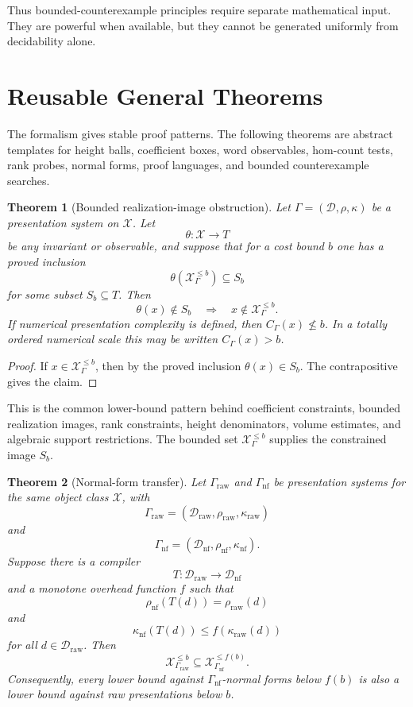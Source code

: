 \documentclass[11pt]{article}
\newtheorem{theorem}{Theorem}[section]
\begin{document}
Thus bounded-counterexample principles require separate mathematical input. They are powerful when available, but they cannot be generated uniformly from decidability alone.


\section{Reusable General Theorems}

The formalism gives stable proof patterns. The following theorems are abstract templates for height balls, coefficient boxes, word observables, hom-count tests, rank probes, normal forms, proof languages, and bounded counterexample searches.

\begin{theorem}[Bounded realization-image obstruction]
Let \(\Gamma=(\mathcal D,\rho,\kappa)\) be a presentation system on \(\mathcal X\). Let
\[
\theta:\mathcal X\to T
\]
be any invariant or observable, and suppose that for a cost bound \(b\) one has a proved inclusion
\[
\theta(\mathcal X_\Gamma^{\leq b})\subseteq S_b
\]
for some subset \(S_b\subseteq T\). Then
\[
\theta(x)\notin S_b
\quad\Longrightarrow\quad
x\notin\mathcal X_\Gamma^{\leq b}.
\]
If numerical presentation complexity is defined, then \(C_\Gamma(x)\nleq b\). In a totally ordered numerical scale this may be written \(C_\Gamma(x)>b\).
\end{theorem}

\begin{proof}
If \(x\in\mathcal X_\Gamma^{\leq b}\), then by the proved inclusion \(\theta(x)\in S_b\). The contrapositive gives the claim.
\end{proof}

This is the common lower-bound pattern behind coefficient constraints, bounded realization images, rank constraints, height denominators, volume estimates, and algebraic support restrictions. The bounded set \(\mathcal X_\Gamma^{\leq b}\) supplies the constrained image \(S_b\).

\begin{theorem}[Normal-form transfer]
Let \(\Gamma_{\mathrm{raw}}\) and \(\Gamma_{\mathrm{nf}}\) be presentation systems for the same object class \(\mathcal X\), with
\[
\Gamma_{\mathrm{raw}}=(\mathcal D_{\mathrm{raw}},\rho_{\mathrm{raw}},\kappa_{\mathrm{raw}})
\]
and
\[
\Gamma_{\mathrm{nf}}=(\mathcal D_{\mathrm{nf}},\rho_{\mathrm{nf}},\kappa_{\mathrm{nf}}).
\]
Suppose there is a compiler
\[
T:\mathcal D_{\mathrm{raw}}\to\mathcal D_{\mathrm{nf}}
\]
and a monotone overhead function \(f\) such that
\[
\rho_{\mathrm{nf}}(T(d))=\rho_{\mathrm{raw}}(d)
\]
and
\[
\kappa_{\mathrm{nf}}(T(d))\leq f(\kappa_{\mathrm{raw}}(d))
\]
for all \(d\in\mathcal D_{\mathrm{raw}}\). Then
\[
\mathcal X_{\Gamma_{\mathrm{raw}}}^{\leq b}
\subseteq
\mathcal X_{\Gamma_{\mathrm{nf}}}^{\leq f(b)}.
\]
Consequently, every lower bound against \(\Gamma_{\mathrm{nf}}\)-normal forms below \(f(b)\) is also a lower bound against raw presentations below \(b\).
\end{theorem}
\end{document}
